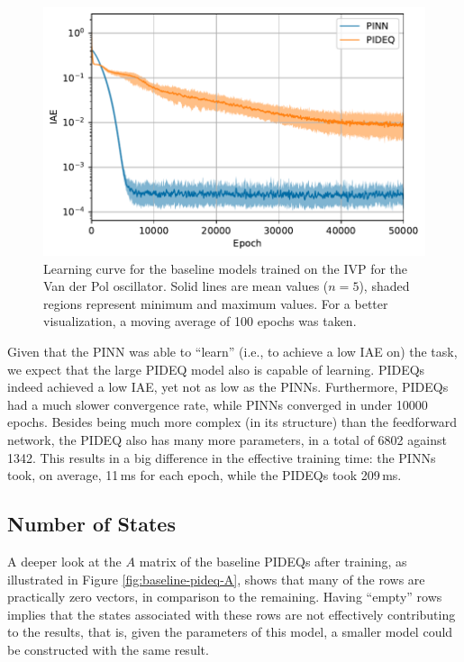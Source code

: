 \begin{figure}[h]
    \centering
    \includegraphics{images/exp_1_iae.pdf}
    \caption[Learning curve for the baseline models trained on the \gls{IVP} for the Van der Pol oscillator.]{Learning curve for the baseline models trained on the \gls{IVP} for the Van der Pol oscillator. Solid lines are mean values ($n=5$), shaded regions represent minimum and maximum values. For a better visualization, a moving average of 100 epochs was taken.}
    \label{fig:baseline-iae}
\end{figure}

Given that the \gls{PINN} was able to ``learn'' (i.e., to achieve a low IAE on) the task, we expect that the large \gls{PIDEQ} model also is capable of learning.
\glspl{PIDEQ} indeed achieved a low IAE, yet not as low as the \glspl{PINN}.
Furthermore, \glspl{PIDEQ} had a much slower convergence rate, while \glspl{PINN} converged in under 10000 epochs.
Besides being much more complex (in its structure) than the feedforward network, the \gls{PIDEQ} also has many more parameters, in a total of 6802 against 1342.
This results in a big difference in the effective training time: the \gls{PINN}s took, on average, 11\,ms for each epoch, while the \gls{PIDEQ}s took 209\,ms.

\subsection{Number of States}

A deeper look at the $A$ matrix of the baseline \gls{PIDEQ}s after training, as illustrated in Figure \ref{fig:baseline-pideq-A}, shows that many of the rows are practically zero vectors, in comparison to the remaining.
Having ``empty'' rows implies that the states associated with these rows are not effectively contributing to the results, that is, given the parameters of this model, a smaller model could be constructed with the same result.  

